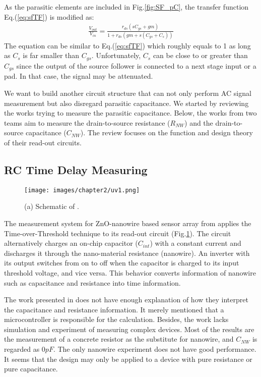 As the parasitic elements are included in Fig.\ref{fig:SF_pC}, the transfer function Eq.(\ref{eq:sfTF}) is modified as:
\begin{align}
    \frac{V_{out}}{V_{in}} = \frac{r_{ds}(sC_{gs} + gm)}{1 + r_{ds}(gm + s(C_{gs}+C_s))}
\end{align}
The equation can be similar to Eq.(\ref{eq:sfTF}) which roughly equals to 1 as long as $C_s$ is far smaller than $C_{gs}$.
Unfortunately, $C_s$ can be close to or greater than $C_{gs}$ since the output of the source follower is connected to a next stage input or a pad.
In that case, the signal may be attenuated.

We want to build another circuit structure that can not only perform AC signal measurement but also disregard parasitic capacitance.
We started by reviewing the works trying to measure the parasitic capacitance.
Below, the works from two teams aim to measure the drain-to-source resistance ($R_{NW}$) and the drain-to-source capacitance ($C_{NW}$).
The review focuses on the function and design theory of their read-out circuits.


\subsection{RC Time Delay Measuring}
\begin{figure}[!htbp]
    \centering
    \texttt{[image: images/chapter2/uv1.png]}
    \caption{(a) Schematic of \cite{Juv1}.}
    \label{fig:tot1}
\end{figure}

The measurement system for ZnO-nanowire based sensor array from \cite{Juv1} applies the Time-over-Threshold technique to its read-out circuit (Fig.\ref{fig:tot1}).
The circuit alternatively charges an on-chip capacitor ($C_{int}$) with a constant current and discharges it through the nano-material resistance (nanowire).
An inverter with its output switches from on to off when the capacitor is charged to its input threshold voltage, and vice versa.
This behavior converts information of nanowire such as capacitance and resistance into time information.

The work presented in \cite{Juv1} does not have enough explanation of how they interpret the capacitance and resistance information.
It merely mentioned that a microcontroller is responsible for the calculation.
Besides, the work lacks simulation and experiment of measuring complex devices.
Most of the results are the measurement of a concrete resistor as the substitute for nanowire, and $C_{NW}$ is regarded as $0pF$.
The only nanowire experiment does not have good performance.
It seems that the design may only be applied to a device with pure resistance or pure capacitance.



